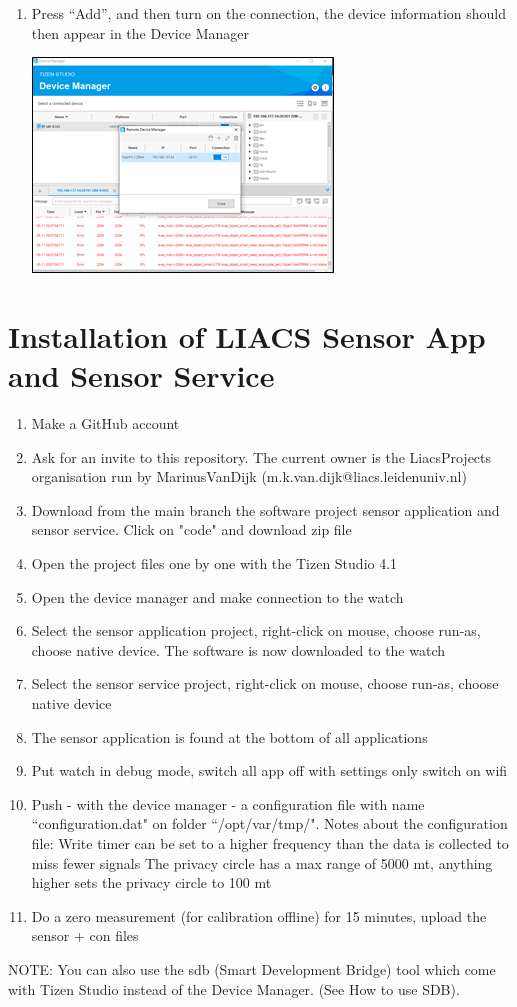 \documentclass[12pt, a4paper]{article}
\begin{document}
\begin{enumerate}
\cleardoublepage
  \item Press “Add”, and then turn on the connection, the device information should then appear in the Device Manager
      \begin{center}
    \includegraphics[width=.6\textwidth]{Pic 19.2.png}
\end{center}
\end{enumerate}
\cleardoublepage

\section{Installation of LIACS Sensor App and Sensor Service}
\begin{enumerate}
  \item Make a GitHub account
  \item Ask for an invite to this repository. The current owner is the LiacsProjects organisation run by MarinusVanDijk (m.k.van.dijk@liacs.leidenuniv.nl)
  \item Download from the main branch the software project sensor application and sensor service. Click on "code" and download zip file
  \item Open the project files one by one with the Tizen Studio 4.1
  \item Open the device manager and make connection to the watch
  \item Select the sensor application project, right-click on mouse, choose run-as, choose native device. The software is now downloaded to the watch
  \item Select the sensor service project, right-click on mouse, choose run-as, choose native device
  \item The sensor application is found at the bottom of all applications
  \item Put watch in debug mode, switch all app off with settings only switch on wifi
  \item Push - with the device manager - a configuration file with name ``configuration.dat" on folder ``/opt/var/tmp/". Notes about the configuration file: Write timer can be set to a higher frequency than the data is collected to miss fewer signals The privacy circle has a max range of 5000 mt, anything higher sets the privacy circle to 100 mt
  \item Do a zero measurement (for calibration offline) for 15 minutes, upload the sensor + con files
\end{enumerate}
NOTE: You can also use the sdb (Smart Development Bridge) tool which come with Tizen Studio instead of the Device Manager. (See How to use SDB).
\end{document}
